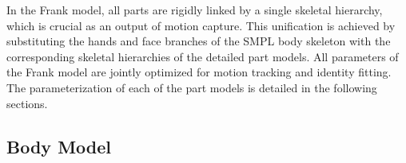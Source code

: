 %
In the Frank model, all parts are rigidly linked by a single skeletal hierarchy, which is crucial as an output of motion capture. This unification is achieved by substituting the hands and face branches of the SMPL body skeleton with the corresponding skeletal hierarchies of the detailed part models. All parameters of the Frank model are jointly optimized for motion tracking and identity fitting. The parameterization of each of the part models is detailed in the following sections.





\subsection{Body Model}

